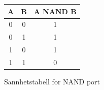     \begin{figure}[!htb]
        \centering
        \caption{Sannhetstabell for NAND port}
        \label{fig:tt_nand}
        \begin{tabular}{|c|c|c|}
            \hline
            \textbf{A} & \textbf{B} & \textbf{A NAND B} \\ \hline
            0 & 0 & 1 \\
            0 & 1 & 1 \\
            1 & 0 & 1 \\
            1 & 1 & 0 \\ \hline
        \end{tabular}
    \end{figure}


